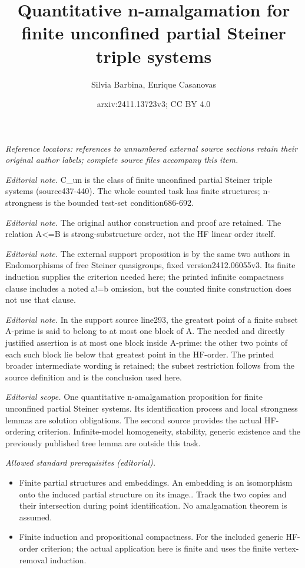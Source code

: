 \documentclass[10pt,a4paper]{article}
\title{Quantitative n-amalgamation for finite unconfined partial Steiner triple systems}
\author{Silvia Barbina, Enrique Casanovas}
\date{arxiv:2411.13723v3; CC BY 4.0}
\theoremstyle{note}
\begin{document}
\maketitle

\noindent\textit{Reference locators: references to unnumbered external source sections retain their original author labels; complete source files accompany this item.}\par

\noindent\textit{Editorial note.} C\_un is the class of finite unconfined partial Steiner triple systems (source437-440). The whole counted task has finite structures; n-strongness is the bounded test-set condition686-692.\par\medskip
\noindent\textit{Editorial note.} The original author construction and proof are retained. The relation A<=B is strong-substructure order, not the HF linear order itself.\par\medskip
\noindent\textit{Editorial note.} The external support proposition is by the same two authors in Endomorphisms of free Steiner quasigroups, fixed version2412.06055v3. Its finite induction supplies the criterion needed here; the printed infinite compactness clause includes a noted a!=b omission, but the counted finite construction does not use that clause.\par\medskip
\noindent\textit{Editorial note.} In the support source line293, the greatest point of a finite subset A-prime is said to belong to at most one block of A. The needed and directly justified assertion is at most one block inside A-prime: the other two points of each such block lie below that greatest point in the HF-order. The printed broader intermediate wording is retained; the subset restriction follows from the source definition and is the conclusion used here.\par\medskip
\noindent\textit{Editorial scope.} One quantitative n-amalgamation proposition for finite unconfined partial Steiner systems. Its identification process and local strongness lemmas are solution obligations. The second source provides the actual HF-ordering criterion. Infinite-model homogeneity, stability, generic existence and the previously published tree lemma are outside this task.\par\medskip
\noindent\textit{Allowed standard prerequisites (editorial).}\begin{itemize}
\item Finite partial structures and embeddings. An embedding is an isomorphism onto the induced partial structure on its image.. Track the two copies and their intersection during point identification. No amalgamation theorem is assumed.
\item Finite induction and propositional compactness. For the included generic HF-order criterion; the actual application here is finite and uses the finite vertex-removal induction.
\end{itemize}\medskip
\end{document}
